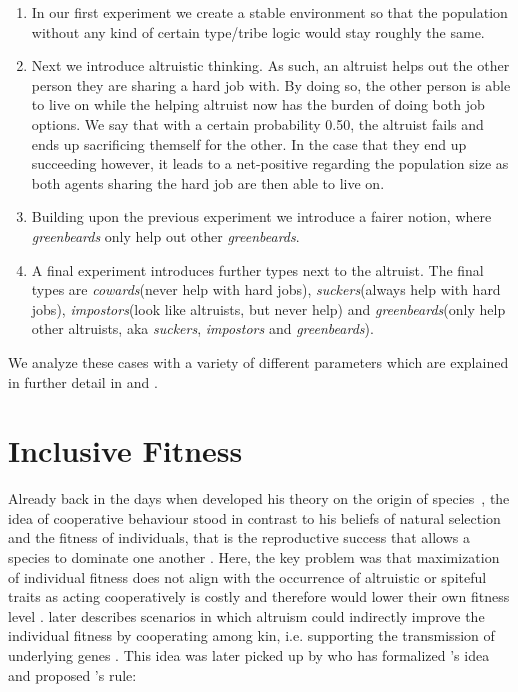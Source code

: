 \documentclass[sigconf]{acmart}
\newcommand{\todo}[1]{{\color{red}{#1}}}
\newcommand{\VProbAltruistDies}{0.50\xspace}
\newcommand{\cowards}{\textit{cowards}\xspace}
\newcommand{\suckers}{\textit{suckers}\xspace}
\newcommand{\impostors}{\textit{impostors}\xspace}
\newcommand{\greenbeards}{\textit{greenbeards}\xspace}
\begin{document}
    \begin{enumerate}
        \item In our first experiment we create a stable environment so that the population without any kind of certain type/tribe logic would stay roughly the same.

        \item Next we introduce altruistic thinking.
        As such, an altruist helps out the other person they are sharing a hard job with.
        By doing so, the other person is able to live on while the helping altruist now has the burden of doing both job options.
        We say that with a certain probability \VProbAltruistDies, the altruist fails and ends up sacrificing themself for the other.
        In the case that they end up succeeding however, it leads to a net-positive regarding the population size as both agents sharing the hard job are then able to live on.

        \item Building upon the previous experiment we introduce a fairer notion, where \greenbeards only help out other \greenbeards.

        \item A final experiment introduces further types next to the altruist.
        The final types are \cowards (never help with hard jobs), \suckers (always help with hard jobs), \impostors (look like altruists, but never help) and  \greenbeards (only help other altruists, aka \suckers, \impostors and \greenbeards).

    \end{enumerate}

    We analyze these cases with a variety of different parameters which are explained in further detail in  and .

    \todo{Mention central results and key insight briefly.}


    \section{Inclusive Fitness}\label{sec:inclusive-fitness}

    Already back in the days when \citeauthor{darwin_origin_1859} developed his theory on the origin of species~\cite{darwin_origin_1859}, the idea of cooperative behaviour stood in contrast to his beliefs of natural selection and the fitness of individuals, that is the reproductive success that allows a species to dominate one another \cite{pennisi_how_2005}.
    Here, the key problem was that maximization of individual fitness does not align with the occurrence of altruistic or spiteful traits as acting cooperatively is costly and therefore would lower their own fitness level \cite{west_altruism_2010}.
    \citeauthor{darwin_origin_1859} later describes scenarios in which altruism could indirectly improve the individual fitness by cooperating among kin, i.e. supporting the transmission of underlying genes \cite{pennisi_how_2005,gardner_theory_2009}.
    This idea was later picked up by \citeauthor{hamilton_kin_1964} who has formalized \citeauthor{darwin_origin_1859}'s idea and proposed \citeauthor{hamilton_kin_1964}'s rule:
\end{document}
